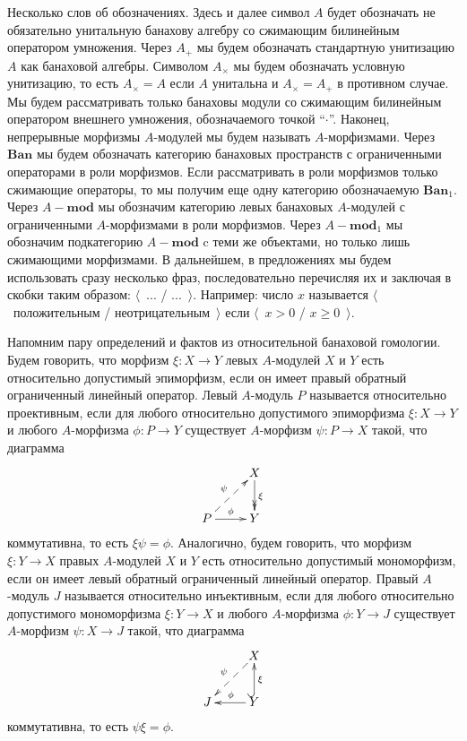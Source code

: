 \documentclass[12pt]{article}
\begin{document}
Несколько слов об обозначениях. Здесь и далее символ $A$ будет обозначать не обязательно унитальную банахову алгебру со сжимающим билинейным оператором умножения. Через $A_+$ мы будем обозначать стандартную унитизацию $A$ как банаховой алгебры. Символом $A_\times$ мы будем обозначать условную унитизацию, то есть $A_\times=A$ если $A$ унитальна и $A_\times=A_+$ в противном случае. Мы будем рассматривать только банаховы модули со сжимающим билинейным оператором внешнего умножения, обозначаемого точкой ``$\cdot$''. Наконец, непрерывные морфизмы $A$-модулей мы будем называть $A$-морфизмами. Через $\mathbf{Ban}$ мы будем обозначать категорию банаховых пространств с ограниченными операторами в роли морфизмов. Если рассматривать в роли морфизмов только сжимающие операторы, то мы получим еще одну категорию обозначаемую $\mathbf{Ban}_1$. Через $A-\mathbf{mod}$ мы обозначим категорию левых банаховых $A$-модулей с ограниченными $A$-морфизмами в роли морфизмов. Через $A-\mathbf{mod}_1$ мы обозначим подкатегорию $A-\mathbf{mod}$ c теми же объектами, но только лишь сжимающими морфизмами. В дальнейшем, в предложениях мы будем использовать сразу несколько фраз, последовательно перечисляя их и заключая в скобки таким образом: $\langle$~... / ...~$\rangle$. Например: число $x$ называется $\langle$~положительным / неотрицательным~$\rangle$ если $\langle$~$x>0$ / $x\geq 0$~$\rangle$.

Напомним пару определений и фактов из относительной банаховой гомологии. Будем говорить, что морфизм $\xi:X\to Y$ левых $A$-модулей $X$ и $Y$ есть относительно допустимый эпиморфизм, если он имеет правый обратный ограниченный линейный оператор. Левый $A$-модуль $P$ называется относительно проективным, если для любого относительно допустимого эпиморфизма $\xi:X\to Y$ и любого $A$-морфизма $\phi:P\to Y$ существует $A$-морфизм $\psi:P\to X$ такой, что диаграмма
$$
\xymatrix{
& {X} \ar@{->>}[d]^{\xi}\\
{P} \ar@{-->}[ur]^{\psi} \ar[r]^{\phi} &{Y}}
$$
коммутативна, то есть $\xi\psi=\phi$. Аналогично, будем говорить, что морфизм $\xi:Y\to X$ правых $A$-модулей $X$ и $Y$ есть относительно допустимый мономорфизм, если он имеет левый обратный ограниченный линейный оператор. Правый $A$-модуль $J$ называется относительно инъективным, если для любого относительно допустимого мономорфизма $\xi:Y\to X$ и любого $A$-морфизма $\phi:Y\to J$ существует $A$-морфизм $\psi:X\to J$ такой, что диаграмма
$$
\xymatrix{
& {X} \ar@{-->}[dl]_{\psi} \\
{J} &{Y} \ar[l]_{\phi} \ar@{^{(}->}[u]_{\xi}}
$$
коммутативна, то есть $\psi\xi=\phi$. 
\end{document}
